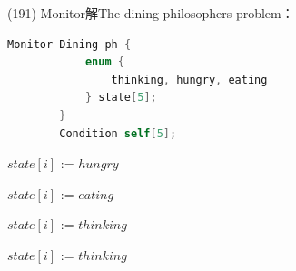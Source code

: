 \begin{theorem}{(191)} Monitor解The dining philosophers problem：
    \begin{lstlisting}[caption={Data structure (The dining philosophers problem (Monitor)).}, language=C, captionpos=b, mathescape=true]
        Monitor Dining-ph {
            enum {
                thinking, hungry, eating
            } state[5];
        } 
        Condition self[5];
    \end{lstlisting}
    \begin{algorithm}[H]
        \caption{$pickup(i)$.}
        \begin{algorithmic}[1]
                \State $state[i]$ := $hungry$
                \State {}
                    \State {}
                \EndIf
            \EndFunction
        \end{algorithmic}
    \end{algorithm}
    \begin{algorithm}[H]
        \caption{$test(i)$.}
        \begin{algorithmic}[1]
                    \State $state[i]$ := $eating$
                    \State {}
                \EndIf
            \EndFunction
        \end{algorithmic}
    \end{algorithm}
    \begin{algorithm}[H]
        \caption{$putdown(i)$.}
        \begin{algorithmic}[1]
                \State $state[i]$ := $thinking$
                \State {}
                \State {}
            \EndFunction
        \end{algorithmic}
    \end{algorithm}
    \begin{algorithm}[H]
        \caption{$initialization\_code(i)$.}
        \begin{algorithmic}[1]
             
                    \State $state[i]$ := $thinking$
                \EndFor
            \EndFunction
        \end{algorithmic}

\end{algorithm}
\end{theorem}
